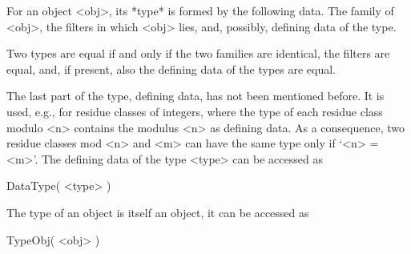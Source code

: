 
For an object <obj>, its *type* is formed by the following data.
The family of <obj>,
the filters in which <obj> lies,
and, possibly, defining data of the type.

Two types are equal if and only if the two families are identical,
the filters are equal, and, if present, also the defining data of the
types are equal.

The last part of the type, defining data, has not been mentioned before.
It is used, e.g., for residue classes of integers, where the type of each
residue class modulo <n> contains the modulus <n> as defining data.
As a consequence, two residue classes mod <n> and <m> can have the same
type only if `<n> = <m>'.
The defining data of the type <type> can be accessed as
%
%
%
%

\>DataType( <type> )

The type of an object is itself an object,
it can be accessed as

\>TypeObj( <obj> )


